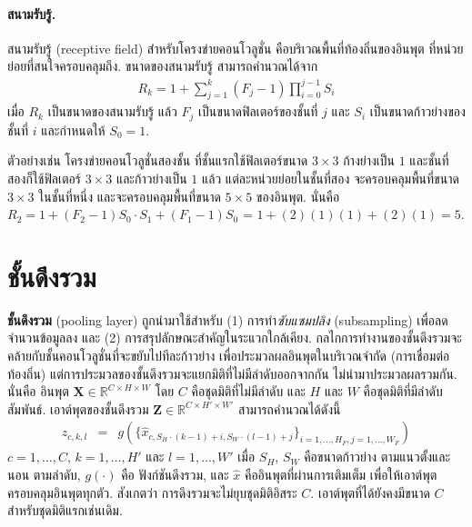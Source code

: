 \paragraph{สนามรับรู้.}
สนามรับรู้ (receptive field)
สำหรับโครงข่ายคอนโวลูชั่น คือบริเวณพื้นที่ท้องถิ่นของอินพุต ที่หน่วยย่อยที่สนใจครอบคลุมถึง.
ขนาดของสนามรับรู้ สามารถคำนวณได้จาก 
\begin{eqnarray}
R_k = 1 + \sum_{j=1}^k (F_j - 1) \prod_{i=0}^{j-1} S_i
\label{eq: receptive field}
\end{eqnarray}
เมื่อ 
$R_k$ เป็นขนาดของสนามรับรู้
แล้ว
$F_j$ เป็นขนาดฟิลเตอร์ของชั้นที่ $j$ และ $S_i$ เป็นขนาดก้าวย่างของชั้นที่ $i$ 
และกำหนดให้ $S_0 = 1$.

ตัวอย่างเช่น โครงข่ายคอนโวลูชั่นสองชั้น 
ที่ชั้นแรกใช้ฟิลเตอร์ขนาด $3 \times 3$ ก้างย่างเป็น $1$ 
และชั้นที่สองก็ใช้ฟิลเตอร์ $3 \times 3$ และก้าวย่างเป็น $1$
แล้ว แต่ละหน่วยย่อยในชั้นที่สอง จะครอบคลุมพื้นที่ขนาด $3 \times 3$ ในชั้นที่หนึ่ง 
และจะครอบคลุมพื้นที่ขนาด $5 \times 5$ ของอินพุต.
นั่นคือ $R_2 = 1 + (F_2 - 1) S_0 \cdot S_1 + (F_1 - 1) S_0$ = $1 + (2)(1)(1) + (2)(1) = 5$.

\section{ชั้นดึงรวม}
\label{sec: pooling layer}
 
\textbf{ชั้นดึงรวม} (pooling layer) ถูกนำมาใช้สำหรับ (1) การทำ\textit{ซับแซมปลิง} (subsampling) เพื่อลดจำนวนข้อมูลลง
และ (2) การสรุปลักษณะสำคัญในระแวกใกล้เคียง.
กลไกการทำงานของชั้นดึงรวมจะคล้ายกับชั้นคอนโวลูชั่นที่จะขยับไปทีละก้าวย่าง เพื่อประมวลผลอินพุตในบริเวณจำกัด (การเชื่อมต่อท้องถิ่น)
แต่การประมวลของชั้นดึงรวมจะแยกมิติที่ไม่มีลำดับออกจากกัน ไม่นำมาประมวลผลรวมกัน.
นั่นคือ อินพุต $\bm{X} \in \mathbb{R}^{C \times H \times W}$ 
โดย $C$ คือชุดมิติที่ไม่มีลำดับ และ $H$ และ $W$ คือชุดมิติที่มีลำดับสัมพันธ์.
เอาต์พุตของชั้นดึงรวม $\bm{Z} \in \mathbb{R}^{C \times H' \times W'}$ 
สามารถคำนวณได้ดังนี้
\begin{eqnarray}
z_{c,k,l} &=& g( \{ \hat{x}_{c, S_H \cdot (k-1)+i, S_W \cdot (l-1)+j} \}_{i=1,\ldots, H_F, j=1,\ldots, W_F} ) 
\label{eq: deep conv pooling} 
\end{eqnarray}
$c = 1, \ldots, C$,
$k = 1, \ldots, H'$ และ
$l = 1, \ldots, W'$
เมื่อ 
$S_H$, $S_W$ คือขนาดก้าวย่าง ตามแนวตั้งและนอน ตามลำดับ,
$g(\cdot)$ คือ ฟังก์ชันดึงรวม,
และ
$\hat{x}$ คืออินพุตที่ผ่านการเติมเต็ม เพื่อให้เอาต์พุตครอบคลุมอินพุตทุกตัว.
สังเกตว่า การดึงรวมจะไม่ยุบชุดมิติอิสระ $C$.
เอาต์พุตที่ได้ยังคงมีขนาด $C$ สำหรับชุดมิติแรกเช่นเดิม. 

